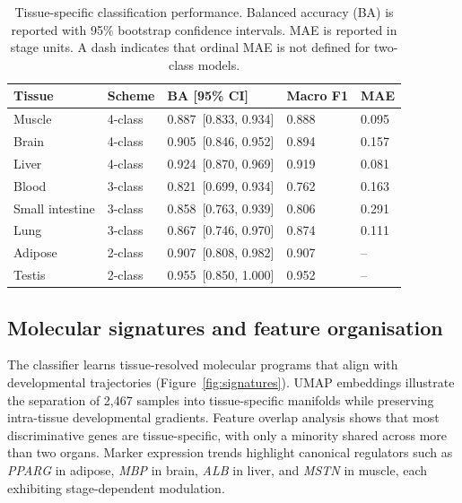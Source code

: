 \documentclass[11pt]{article}
\begin{document}
\begin{table}[htbp]
  \centering
  \caption{Tissue-specific classification performance. Balanced accuracy (BA) is reported with 95\% bootstrap confidence intervals. MAE is reported in stage units. A dash indicates that ordinal MAE is not defined for two-class models.}
  \label{tab:performance}
  \begin{tabular}{lllll}
    \toprule
    Tissue & Scheme & BA [95\% CI] & Macro F1 & MAE \\
    \midrule
    Muscle & 4-class & 0.887~[0.833, 0.934] & 0.888 & 0.095 \\
    Brain & 4-class & 0.905~[0.846, 0.952] & 0.894 & 0.157 \\
    Liver & 4-class & 0.924~[0.870, 0.969] & 0.919 & 0.081 \\
    Blood & 3-class & 0.821~[0.699, 0.934] & 0.762 & 0.163 \\
    Small intestine & 3-class & 0.858~[0.763, 0.939] & 0.806 & 0.291 \\
    Lung & 3-class & 0.867~[0.746, 0.970] & 0.874 & 0.111 \\
    Adipose & 2-class & 0.907~[0.808, 0.982] & 0.907 & -- \\
    Testis & 2-class & 0.955~[0.850, 1.000] & 0.952 & -- \\
    \bottomrule
  \end{tabular}
\end{table}

\subsection{Molecular signatures and feature organisation}
The classifier learns tissue-resolved molecular programs that align with developmental trajectories (Figure~\ref{fig:signatures}). UMAP embeddings illustrate the separation of 2{,}467 samples into tissue-specific manifolds while preserving intra-tissue developmental gradients. Feature overlap analysis shows that most discriminative genes are tissue-specific, with only a minority shared across more than two organs. Marker expression trends highlight canonical regulators such as \textit{PPARG} in adipose, \textit{MBP} in brain, \textit{ALB} in liver, and \textit{MSTN} in muscle, each exhibiting stage-dependent modulation.
\end{document}
